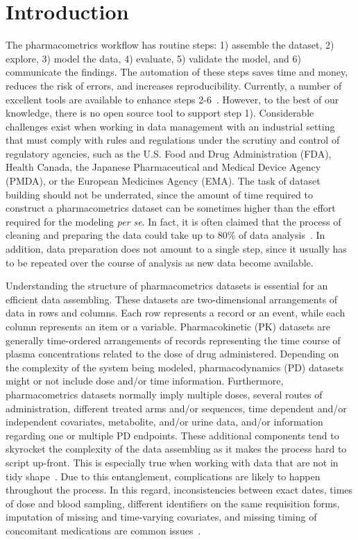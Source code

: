 \section{Introduction}
The pharmacometrics workflow has routine steps: 1) assemble the dataset, 2) explore, 3) model the data, 4) evaluate, 5) validate the model, and 6) communicate the findings. The automation of these steps saves time and money, reduces the risk of errors, and increases reproducibility. Currently, a number of excellent tools are available to enhance steps 2-6~\citep{Jonsson1999, Lindbom2005, Keizer2011, Keizer2015, Mouksassi2016, Wang2016, Keizer2018, Xie2018, Mouksassi2019, Baron2019,RStudio}. However, to the best of our knowledge, there is no open source tool to support step 1). 
Considerable challenges exist when working in data management with an industrial setting that must comply with rules and regulations under the scrutiny and control of regulatory agencies, such as the U.S. Food and Drug Administration (FDA), Health Canada, the Japanese Pharmaceutical and Medical Device Agency (PMDA), or the European Medicines Agency (EMA). The task of dataset building should not be underrated, since the amount of time required to construct a pharmacometrics dataset can be sometimes higher than the effort required for the modeling \textit{per se}. In fact, it is often claimed that the process of cleaning and preparing the data could take up to 80\% of data analysis~\citep{Dasu2003}. In addition, data preparation does not amount to a single step, since it usually has to be repeated over the course of analysis as new data become available. 

Understanding the structure of pharmacometrics datasets is essential for an efficient data assembling. These datasets are two-dimensional arrangements of data in rows and columns. Each row represents a record or an event, while each column represents an item or a variable. Pharmacokinetic (PK) datasets are generally time-ordered arrangements of records representing the time course of plasma concentrations related to the dose of drug administered. Depending on the complexity of the system being modeled, pharmacodynamics (PD) datasets might or not include dose and/or time information. Furthermore, pharmacometrics datasets normally imply multiple doses, several routes of administration, different treated arms and/or sequences, time dependent and/or independent covariates, metabolite, and/or urine data, and/or information regarding one or multiple PD endpoints. These additional components tend to skyrocket the complexity of the data assembling as it makes the process hard to script up-front. This is especially true when working with data that are not in tidy shape~\citep{Wickham2014}. Due to this entanglement, complications are likely to happen throughout the process. In this regard, inconsistencies between exact dates, times of dose and blood sampling, different identifiers on the same requisition forms, imputation of missing and time-varying covariates, and missing timing of concomitant medications are common issues~\citep{Grasela2007}.


